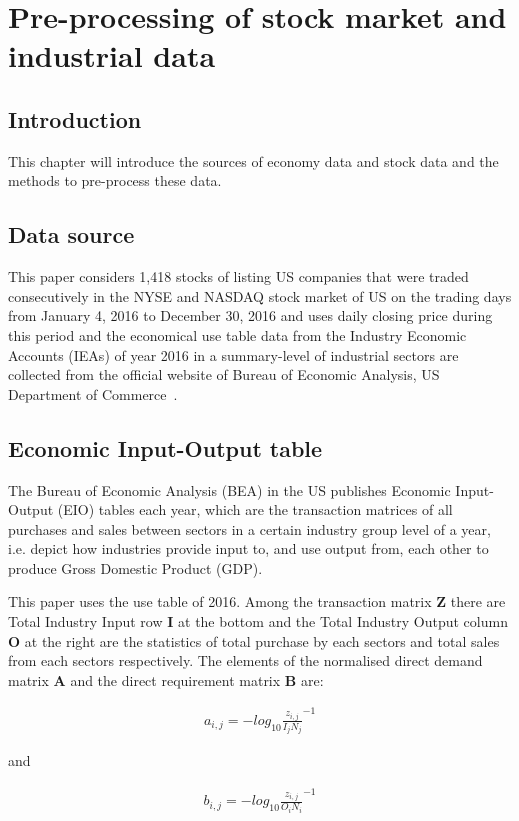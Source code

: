 \chapter[Pre-processing of data]{Pre-processing of stock market and industrial data}
\section{Introduction}
This chapter will introduce the sources of economy data and stock data and the methods to pre-process these data. 

\section{Data source}
This paper considers 1,418 stocks of listing US companies that were traded consecutively in the NYSE and NASDAQ stock market of US on the trading days from January 4, 2016 to December 30, 2016 and uses daily closing price during this period and the economical use table data from the Industry Economic Accounts (IEAs) of year 2016 in a summary-level of industrial sectors are collected from the official website of Bureau of Economic Analysis, US Department of Commerce~\cite{bea}.

\section{Economic Input-Output table}
The Bureau of Economic Analysis (BEA) in the US publishes Economic Input-Output (EIO) tables each year, which are the transaction matrices of all purchases and sales between sectors in a certain industry group level of a year, i.e. depict how industries provide input to, and use output from, each other to produce Gross Domestic Product (GDP).

This paper uses the use table of 2016. Among the transaction matrix \textbf{Z} there are Total Industry Input row \textbf{I} at the bottom and the Total Industry Output column \textbf{O} at the right are the statistics of total purchase by each sectors and total sales from each sectors respectively. The elements of the normalised direct demand matrix \textbf{A} and the direct requirement matrix \textbf{B} are:

\begin{eqnarray}\label{equ:eio_i}
a_{i,j} = -log_{10}{\frac{z_{i,j}}{I_j N_j}}^{-1}
\end{eqnarray}

and

\begin{eqnarray}\label{equ:eio_o}
b_{i,j} = -log_{10}{\frac{z_{i,j}}{O_i N_i}}^{-1}
\end{eqnarray}

